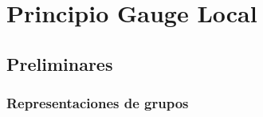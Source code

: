 \chapter{Principio Gauge Local}
\label{cha:princ-gauge-local} %

\section{Preliminares}

\subsection{Representaciones de grupos}

